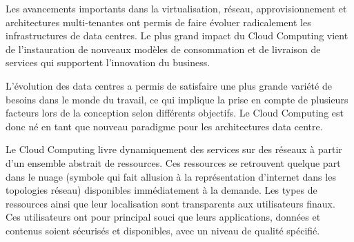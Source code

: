 \par
Les avancements importants dans la virtualisation, réseau, approvisionnement et architectures multi-tenantes ont permis de faire évoluer radicalement les infrastructures de data centres. Le plus grand impact du Cloud Computing vient de l'instauration de nouveaux modèles de consommation et de livraison de services qui supportent l'innovation du business.



L'évolution des data centres a permis de satisfaire une plus grande variété de besoins dans le monde du travail, ce qui implique la prise en compte de plusieurs facteurs lors de la conception selon différents objectifs. Le Cloud Computing est donc né en tant que nouveau paradigme pour les architectures data centre.


Le Cloud Computing livre dynamiquement des services sur des réseaux à partir d'un ensemble abstrait de ressources. Ces ressources se retrouvent quelque part dans le \og nuage \fg{} (symbole qui fait allusion à la représentation d'internet dans les topologies réseau) disponibles immédiatement à la demande. Les types de ressources ainsi que leur localisation sont transparents aux utilisateurs finaux. Ces utilisateurs ont pour principal souci que leurs applications, données et contenus soient sécurisés et disponibles, avec un niveau de qualité spécifié.


